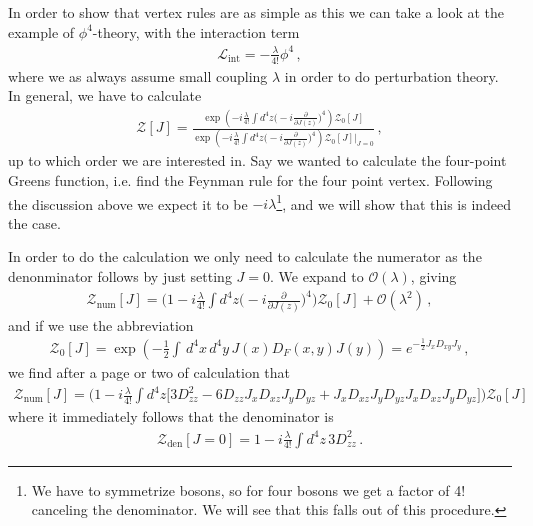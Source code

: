 In order to show that vertex rules are as simple as this we can take a look at the example of $\phi^{4}$-theory, with the interaction term
\begin{align}
    \mathcal{L}_{\text{int}}=-\frac{\lambda}{4!}\phi^{4}\,,
\end{align}
where we as always assume small coupling $\lambda$ in order to do perturbation theory. In general, we have to calculate
\begin{align}
    \mathcal{Z}[J]=\frac{\exp(-i\frac{\lambda}{4!}\int d^{4}z\Big(-i\frac{\partial}{\partial J(z)}\Big)^{4})\mathcal{Z}_{0}[J]}{\exp(-i\frac{\lambda}{4!}\int d^{4}z\Big(-i\frac{\partial}{\partial J(z)}\Big)^{4})\mathcal{Z}_{0}[J]\Big|_{J=0}}\,,
\end{align}
up to which order we are interested in. Say we wanted to calculate the four-point Greens function, i.e. find the Feynman rule for the four point vertex. Following the discussion above we expect it to be $-i\lambda$\footnote{We have to symmetrize bosons, so for four bosons we get a factor of 4! canceling the denominator. We will see that this falls out of this procedure.}, and we will show that this is indeed the case. 

In order to do the calculation we only need to calculate the numerator as the denonminator follows by just setting $J=0$. We expand to $\mathcal{O}(\lambda)$, giving
\begin{align}
    \mathcal{Z}_{\text{num}}[J]=\Big(1-i\frac{\lambda}{4!}\int d^{4}z\Big(-i\frac{\partial}{\partial J(z)}\Big)^{4}\Big)\mathcal{Z}_{0}[J]+\mathcal{O}(\lambda^{2})\,,
\end{align}
and if we use the abbreviation
\begin{align}
    \mathcal{Z}_{0}[J]=\exp(-\frac{1}{2}\int\,d^{4}x\,d^{4}y\,J(x)D_{F}(x,y)J(y))=e^{-\frac{1}{2}J_{x}D_{xy}J_{y}}\,,
\end{align}
we find after a page or two of calculation that
\begin{align}
    \mathcal{Z}_{\text{num}}[J]=\Big(1-i\frac{\lambda}{4!}\int d^{4}z\big[3D_{zz}^{2}-6D_{zz}J_{x}D_{xz}J_{y}D_{yz}+J_{x}D_{xz}J_{y}D_{yz}J_{x}D_{xz}J_{y}D_{yz}\big]\Big)\mathcal{Z}_{0}[J]
\end{align}
where it immediately follows that the denominator is
\begin{align}
    \mathcal{Z}_{\text{den}}[J=0]=1-i\frac{\lambda}{4!}\int d^{4}z\,3D_{zz}^{2}\,.
\end{align}

